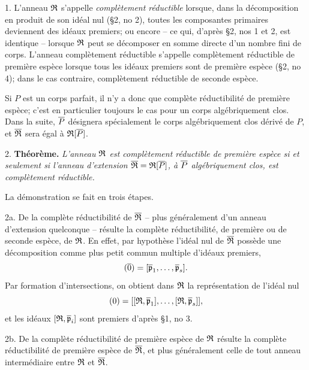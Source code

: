 1. L'anneau $\mathfrak R$ s'appelle \emph{complètement réductible} lorsque, dans la décomposition en produit de son idéal nul (\S 2, no 2), toutes les composantes primaires deviennent des idéaux premiers; ou encore -- ce qui, d'après \S 2, nos 1 et 2, est identique -- lorsque $\mathfrak R$ peut se décomposer en somme directe d'un nombre fini de corps. L'anneau complètement réductible s'appelle complètement réductible de première espèce lorsque tous les idéaux premiers sont de première espèce (\S 2, no 4); dans le cas contraire, complètement réductible de seconde espèce.

Si $P$ est un corps parfait, il n'y a donc que complète réductibilité de première espèce; c'est en particulier toujours le cas pour un corps algébriquement clos. Dans la suite, $\overline P$ désignera spécialement le corps algébriquement clos dérivé de $P$, et $\overline{\mathfrak R}$ sera égal à $\mathfrak R[\overline P]$.

2. \textbf{Théorème.} \emph{L'anneau $\mathfrak R$ est complètement réductible de première espèce si et seulement si l'anneau d'extension $\overline{\mathfrak R}=\mathfrak R[\overline P]$, à $\overline P$ algébriquement clos, est complètement réductible.}

La démonstration se fait en trois étapes.

2a. De la complète réductibilité de $\overline{\mathfrak R}$ -- plus généralement d'un anneau d'extension quelconque -- résulte la complète réductibilité, de première ou de seconde espèce, de $\mathfrak R$. En effet, par hypothèse l'idéal nul de $\overline{\mathfrak R}$ possède une décomposition comme plus petit commun multiple d'idéaux premiers,
\[
        (\overline{0})=[\overline{\mathfrak p}_1,\ldots,\overline{\mathfrak p}_s].
\]
Par formation d'intersections, on obtient dans $\mathfrak R$ la représentation de l'idéal nul
\[
        (0)=[[\mathfrak R,\overline{\mathfrak p}_1],\ldots,[\mathfrak R,\overline{\mathfrak p}_s]],
\]
et les idéaux $[\mathfrak R,\overline{\mathfrak p}_i]$ sont premiers d'après \S 1, no 3.

2b. De la complète réductibilité de première espèce de $\mathfrak R$ résulte la complète réductibilité de première espèce de $\overline{\mathfrak R}$, et plus généralement celle de tout anneau intermédiaire entre $\mathfrak R$ et $\overline{\mathfrak R}$.

